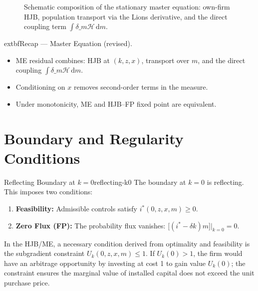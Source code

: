 \documentclass[11pt,letterpaper,oneside]{article}
\numberwithin{equation}{section}
\newcommand{\1}{\mathbf{1}}
\newcommand{\Dm}{D\_m}
\begin{document}
\begin{figure}[ht]
\centering
{}
\label{fig:me_schematic}
\caption{Schematic composition of the stationary master equation: own-firm HJB, population transport via the Lions derivative, and the direct coupling term $\int \delta\_m \mathcal H\,\mathrm dm$.}
\end{figure}

\begin{tcolorbox}[didacticstyle]
  	extbf{Recap --- Master Equation (revised).}
\begin{itemize}[leftmargin=1.15em,itemsep=0.2em]
  \item ME residual combines: HJB at $(k,z,x)$, transport over $m$, and the direct coupling $\int \delta\_m \mathcal H\,\mathrm dm$.
  \item Conditioning on $x$ removes second-order terms in the measure.
  \item Under monotonicity, ME and HJB--FP fixed point are equivalent.
\end{itemize}
\end{tcolorbox}

\section{Boundary and Regularity Conditions}
\label{sec:boundary-regularity}

\begin{definition}{Reflecting Boundary at $k=0$}{reflecting-k0}
The boundary at $k=0$ is reflecting. This imposes two conditions:
\begin{enumerate}[label=(\roman*),itemsep=0.25em]
    \item \textbf{Feasibility:} Admissible controls satisfy $i^*(0,z,x,m)\ge 0$.
    \item \textbf{Zero Flux (FP):} The probability flux vanishes: $\big[(i^*-\delta k)m\big]\big|_{k=0}=0$.
\end{enumerate}
In the HJB/ME, a necessary condition derived from optimality and feasibility is the subgradient constraint $U_k(0,z,x,m)\le 1$. If $U_k(0)>1$, the firm would have an arbitrage opportunity by investing at cost 1 to gain value $U_k(0)$; the constraint ensures the marginal value of installed capital does not exceed the unit purchase price.
\end{definition}
\end{document}
